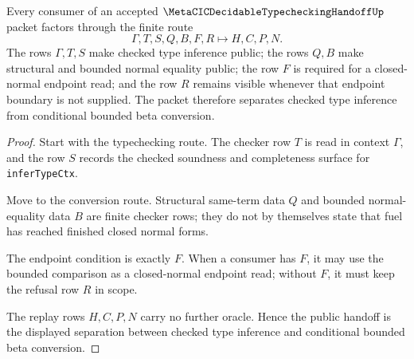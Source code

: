 \begin{theorem}
\label{thm:metacic-decidable-typechecking-closed-normal-boundary}
Every consumer of an accepted $\MetaCICDecidableTypecheckingHandoffUp$ packet factors through the finite route
$$
\Gamma,T,S,Q,B,F,R \longmapsto H,C,P,N .
$$
The rows $\Gamma,T,S$ make checked type inference public; the rows $Q,B$ make structural and bounded normal equality public; the row $F$ is required for a closed-normal endpoint read; and the row $R$ remains visible whenever that endpoint boundary is not supplied. The packet therefore separates checked type inference from conditional bounded beta conversion.
\end{theorem}
\begin{proof}
Start with the typechecking route. The checker row $T$ is read in context $\Gamma$, and the row $S$ records the checked soundness and completeness surface for \texttt{inferTypeCtx}.

Move to the conversion route. Structural same-term data $Q$ and bounded normal-equality data $B$ are finite checker rows; they do not by themselves state that fuel has reached finished closed normal forms.

The endpoint condition is exactly $F$. When a consumer has $F$, it may use the bounded comparison as a closed-normal endpoint read; without $F$, it must keep the refusal row $R$ in scope.

The replay rows $H,C,P,N$ carry no further oracle. Hence the public handoff is the displayed separation between checked type inference and conditional bounded beta conversion.
\end{proof}





